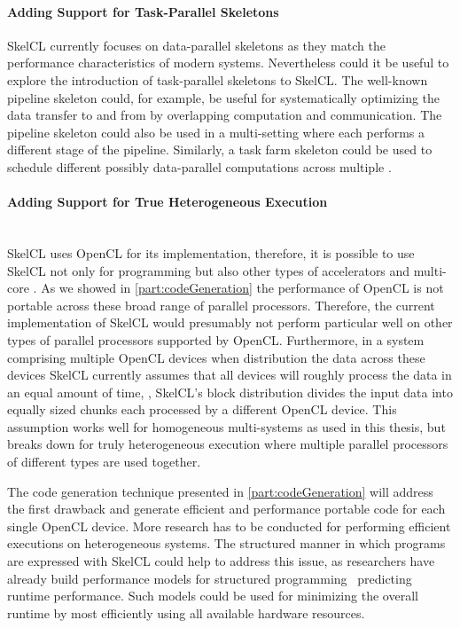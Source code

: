 \paragraph{Adding Support for Task-Parallel Skeletons}
SkelCL currently focuses on data-parallel skeletons as they match the performance characteristics of modern \GPU systems.
Nevertheless could it be useful to explore the introduction of task-parallel skeletons to SkelCL.
The well-known pipeline skeleton could, for example, be useful for systematically optimizing the data transfer to and from \GPUs by overlapping computation and communication.
The pipeline skeleton could also be used in a multi-\GPU setting where each \GPUs performs a different stage of the pipeline.
Similarly, a task farm skeleton could be used to schedule different possibly data-parallel computations across multiple \GPUs.

\paragraph{Adding Support for True Heterogeneous Execution}\hfill\\
SkelCL uses OpenCL for its implementation, therefore, it is possible to use SkelCL not only for programming \GPUs but also other types of accelerators and multi-core \CPUs.
As we showed in \autoref{part:codeGeneration} the performance of OpenCL is not portable across these broad range of parallel processors.
Therefore, the current implementation of SkelCL would presumably not perform particular well on other types of parallel processors supported by OpenCL.
Furthermore, in a system comprising multiple OpenCL devices when distribution the data across these devices SkelCL currently assumes that all devices will roughly process the data in an equal amount of time, \ie, SkelCL's block distribution divides the input data into equally sized chunks each processed by a different OpenCL device.
This assumption works well for homogeneous multi-\GPU systems as used in this thesis, but breaks down for truly heterogeneous execution where multiple parallel processors of different types are used together.

The code generation technique presented in \autoref{part:codeGeneration} will address the first drawback and generate efficient and performance portable code for each single OpenCL device.
More research has to be conducted for performing efficient executions on heterogeneous systems.
The structured manner in which programs are expressed with SkelCL could help to address this issue, as researchers have already build performance models for structured programming~\cite{BischofGK03,Alt2007,JavedL11,StegmeierFrJAUn2015} predicting runtime performance.
Such models could be used for minimizing the overall runtime by most efficiently using all available hardware resources.


